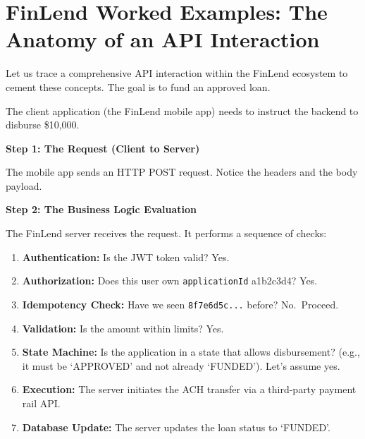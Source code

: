 \section{FinLend Worked Examples: The Anatomy of an API
Interaction}\label{finlend-worked-examples-the-anatomy-of-an-api-interaction}

Let us trace a comprehensive API interaction within the FinLend
ecosystem to cement these concepts. The goal is to fund an approved
loan.

The client application (the FinLend mobile app) needs to instruct the
backend to disburse \$10,000.

\textbf{Step 1: The Request (Client to Server)}

The mobile app sends an HTTP POST request. Notice the headers and the
body payload.

\begin{Shaded}
\begin{Highlighting}[]

\NormalTok{\{}
\NormalTok{  \}}
\NormalTok{\}}
\end{Highlighting}
\end{Shaded}

\textbf{Step 2: The Business Logic Evaluation}

The FinLend server receives the request. It performs a sequence of
checks:

\begin{enumerate}
\def\labelenumi{\arabic{enumi}.}
\tightlist
\item
  \textbf{Authentication:} Is the JWT token valid? Yes.
\item
  \textbf{Authorization:} Does this user own \texttt{applicationId}
  a1b2c3d4? Yes.
\item
  \textbf{Idempotency Check:} Have we seen \texttt{8f7e6d5c...} before?
  No.~Proceed.
\item
  \textbf{Validation:} Is the amount within limits? Yes.
\item
  \textbf{State Machine:} Is the application in a state that allows
  disbursement? (e.g., it must be `APPROVED' and not already `FUNDED').
  Let's assume yes.
\item
  \textbf{Execution:} The server initiates the ACH transfer via a
  third-party payment rail API.
\item
  \textbf{Database Update:} The server updates the loan status to
  `FUNDED'.
\end{enumerate}

